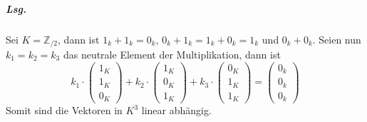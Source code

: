 \documentclass{scrreprt}
\begin{document}
\subparagraph{Lsg.} Sei $K = \mathbb{Z}_{/2}$, dann ist
$1_k + 1_k = 0_k$, $0_k + 1_k = 1_k + 0_k = 1_k$ und $0_k + 0_k$.
Seien nun $k_1 = k_2 = k_3$ das neutrale Element der Multiplikation,
dann ist
\[
  k_1 \cdot \begin{pmatrix}1_K \\ 1_K \\ 0_K \end{pmatrix} +
  k_2 \cdot \begin{pmatrix}1_K \\ 0_K \\ 1_K \end{pmatrix} +
  k_3 \cdot \begin{pmatrix}0_K \\ 1_K \\ 1_K \end{pmatrix} =
  \begin{pmatrix}0_k \\ 0_k \\ 0_k\end{pmatrix}
\]
Somit sind die Vektoren in $K^3$ linear abhängig.
\end{document}
